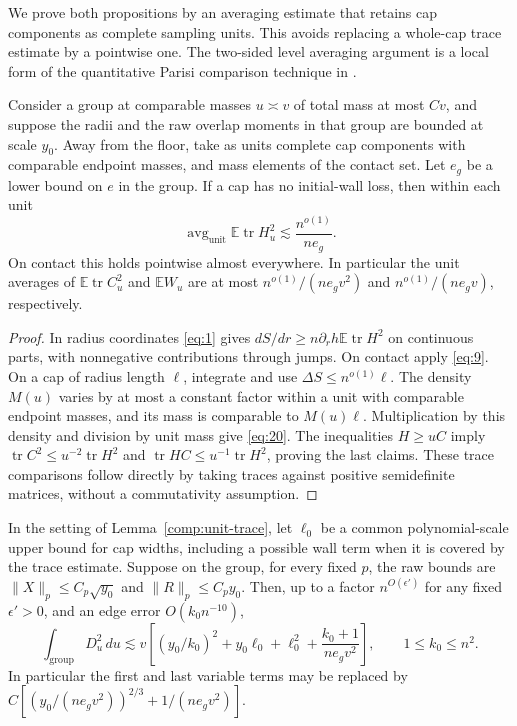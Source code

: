 We prove both propositions by an averaging estimate that retains cap
components as complete sampling units.  This avoids replacing a
whole-cap trace estimate by a pointwise one.  The two-sided level
averaging argument is a local form of the quantitative Parisi
comparison technique in \cite[Lemma~3.3]{AL2026}.

\begin{lemma}\label{comp:unit-trace}
Consider a group at comparable masses $u\asymp v$ of total mass at
most $Cv$, and suppose the radii and the raw overlap moments in that
group are bounded at scale $y_0$.  Away from the floor, take as units
complete cap components with comparable endpoint masses, and mass
elements of the contact set.  Let $e_g$ be a lower bound on $e$ in
the group.  If a cap has no initial-wall loss, then within each unit
\begin{equation}
 \operatorname{avg}_{\mathrm{unit}}
       \mathbb E\operatorname{tr}H_u^2
 \lesssim\frac{n^{o(1)}}{ne_g}.
 \tag{20}\label{eq:20}
\end{equation}
On contact this holds pointwise almost everywhere.  In particular the
unit averages of $\mathbb E\operatorname{tr}C_u^2$ and $\mathbb EW_u$
are at most $n^{o(1)}/(ne_gv^2)$ and $n^{o(1)}/(ne_gv)$, respectively.
\end{lemma}

\begin{proof}
In radius coordinates \eqref{eq:1} gives
$dS/dr\ge n \partial_r h\mathbb E\operatorname{tr}H^2$ on continuous parts,
with nonnegative contributions through jumps.  On contact apply
\eqref{eq:9}.  On a cap of radius length $\ell$, integrate and use
$\Delta S\le n^{o(1)}\ell$.  The density $M(u)$ varies by at most a
constant factor within a unit with comparable endpoint masses, and
its mass is comparable to $M(u)\ell$.  Multiplication by this density
and division by unit mass give \eqref{eq:20}.
The inequalities $H\ge uC$ imply
$\operatorname{tr}C^2\le u^{-2}\operatorname{tr}H^2$ and
$\operatorname{tr}HC\le u^{-1}\operatorname{tr}H^2$, proving the last
claims.  These trace comparisons follow directly by taking traces
against positive semidefinite matrices, without a commutativity
assumption.
\end{proof}

\begin{lemma}\label{comp:bracket}
In the setting of Lemma~\ref{comp:unit-trace}, let $\ell_0$ be a common
polynomial-scale upper bound for cap widths, including a possible wall
term when it is covered by the trace estimate.  Suppose on the group,
for every fixed $p$, the raw bounds are
$\|X\|_p\le C_p\sqrt{y_0}$ and
$\|R\|_p\le C_py_0$.  Then, up to a factor $n^{O(\epsilon')}$ for
any fixed $\epsilon'>0$, and an edge error $O(k_0n^{-10})$,
\begin{equation}
 \int_{\mathrm{group}}D_u^2\,du
 \lesssim v\left[
       (y_0/k_0)^2+y_0\ell_0+\ell_0^2
              +\frac{k_0+1}{ne_gv^2}\right],
 \qquad 1\le k_0\le n^2.
 \tag{21}\label{eq:21}
\end{equation}
In particular the first and last variable terms may be replaced by
$C[(y_0/(ne_gv^2))^{2/3}+1/(ne_gv^2)]$.
\end{lemma}

